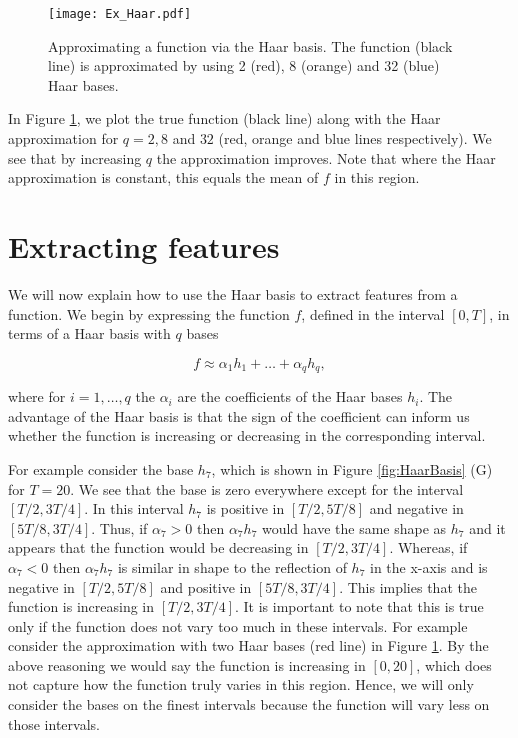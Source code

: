 \documentclass[../main.tex]{subfiles}
\begin{document}
     \begin{figure}[t!]
   \hrulefill
   \begin{center} 
    {\texttt{[image: Ex\_Haar.pdf]} }
    \end{center}     
    \caption{Approximating a function via the Haar basis. The function (black line) is approximated by using 2 (red), 8 (orange) and 32 (blue) Haar bases.}
    \label{fig:HaarApprox}
    \hrulefill
    \end{figure}
 
 In Figure \ref{fig:HaarApprox}, we plot the true function (black line) along with the Haar approximation for $q = 2,8$ and $32$ (red, orange and blue lines respectively). We see that by increasing $q$ the approximation improves. Note that where the Haar approximation is constant, this equals the mean of $f$ in this region.

\section{Extracting features}
We will now explain how to use the Haar basis to extract features from a function. We begin by expressing the function $f$, defined in the interval $[0,T]$, in terms of a Haar basis with $q$ bases

$$
f \approx \alpha_1 h_1 + \dots + \alpha_{q} h_q, 
$$

where for $i = 1, \dots , q$ the $\alpha_i$ are the coefficients of the Haar bases $h_i$. The advantage of the Haar basis is that the sign of the coefficient can inform us whether the function is increasing or decreasing in the corresponding interval.

For example consider the base $h_7$, which is shown in  Figure \ref{fig:HaarBasis} (G) for $T=20$. We see that the base is zero everywhere except for the interval $[T/2, 3T/4]$. In this interval $h_{7}$ is positive in $[T/2, 5T/8]$ and negative in $[5T/8, 3T/4]$. Thus, if $\alpha_7 >0$ then $\alpha_7 h_7$ would have the same shape as $h_7$ and it appears that the function would be decreasing in $[T/2, 3T/4]$. Whereas, if $\alpha_7 < 0$ then $\alpha_7 h_7$ is similar in shape to the reflection of $h_7$ in the x-axis and is negative in $[T/2, 5T/8]$ and positive in $[5T/8, 3T/4]$. This implies that the function is increasing in $[T/2, 3T/4]$. It is important to note that this is true only if the function does not vary too much in these intervals. For example consider the approximation with two Haar bases (red line) in Figure \ref{fig:HaarApprox}. By the above reasoning we would say the function is increasing in $[0,20]$, which does not capture how the function truly varies in this region. Hence, we will only consider the bases on the finest intervals because the function will vary less on those intervals. 
\end{document}
